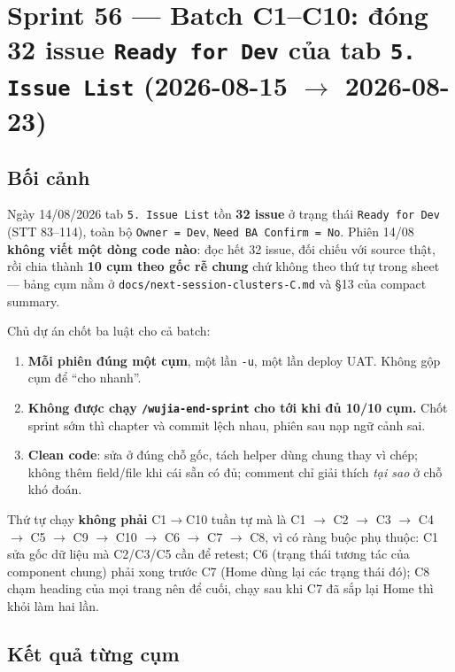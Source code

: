 \chapter{Sprint 56 --- Batch C1--C10: đóng 32 issue \texttt{Ready for Dev} của tab \texttt{5. Issue List} (2026-08-15 $\rightarrow$ 2026-08-23)}

\section{Bối cảnh}

Ngày 14/08/2026 tab \texttt{5. Issue List} tồn \textbf{32 issue} ở trạng thái
\texttt{Ready for Dev} (STT 83--114), toàn bộ \texttt{Owner = Dev},
\texttt{Need BA Confirm = No}. Phiên 14/08 \textbf{không viết một dòng code nào}: đọc hết 32
issue, đối chiếu với source thật, rồi chia thành \textbf{10 cụm theo gốc rễ chung} chứ không
theo thứ tự trong sheet --- bảng cụm nằm ở \texttt{docs/next-session-clusters-C.md} và §13 của
compact summary.

Chủ dự án chốt ba luật cho cả batch:

\begin{enumerate}
\item \textbf{Mỗi phiên đúng một cụm}, một lần \texttt{-u}, một lần deploy UAT. Không gộp cụm
  để ``cho nhanh''.
\item \textbf{Không được chạy \texttt{/wujia-end-sprint} cho tới khi đủ 10/10 cụm.} Chốt sprint
  sớm thì chapter và commit lệch nhau, phiên sau nạp ngữ cảnh sai.
\item \textbf{Clean code}: sửa ở đúng chỗ gốc, tách helper dùng chung thay vì chép; không thêm
  field/file khi cái sẵn có đủ; comment chỉ giải thích \emph{tại sao} ở chỗ khó đoán.
\end{enumerate}

Thứ tự chạy \textbf{không phải} C1$\rightarrow$C10 tuần tự mà là
C1 $\rightarrow$ C2 $\rightarrow$ C3 $\rightarrow$ C4 $\rightarrow$ C5 $\rightarrow$ C9
$\rightarrow$ C10 $\rightarrow$ C6 $\rightarrow$ C7 $\rightarrow$ C8, vì có ràng buộc phụ
thuộc: C1 sửa gốc dữ liệu mà C2/C3/C5 cần để retest; C6 (trạng thái tương tác của component
chung) phải xong trước C7 (Home dùng lại các trạng thái đó); C8 chạm heading của mọi trang nên
để cuối, chạy sau khi C7 đã sắp lại Home thì khỏi làm hai lần.

\section{Kết quả từng cụm}

